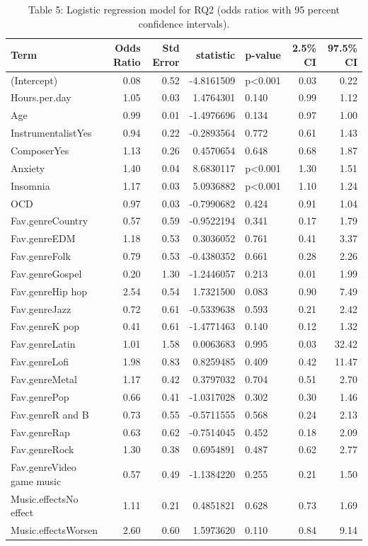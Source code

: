 \documentclass[
  letterpaper,
  DIV=11,
  numbers=noendperiod]{scrartcl}
\begin{document}
\begin{longtable}[t]{lrrrlrr}
\caption{Table 5: Logistic regression model for RQ2 (odds ratios with 95 percent confidence intervals).}\\
\toprule
Term & Odds Ratio & Std Error & statistic & p-value & 2.5\% CI & 97.5\% CI\\
\midrule
(Intercept) & 0.08 & 0.52 & -4.8161509 & p<0.001 & 0.03 & 0.22\\
Hours.per.day & 1.05 & 0.03 & 1.4764301 & 0.140 & 0.99 & 1.12\\
Age & 0.99 & 0.01 & -1.4976696 & 0.134 & 0.97 & 1.00\\
InstrumentalistYes & 0.94 & 0.22 & -0.2893564 & 0.772 & 0.61 & 1.43\\
ComposerYes & 1.13 & 0.26 & 0.4570654 & 0.648 & 0.68 & 1.87\\
\addlinespace
Anxiety & 1.40 & 0.04 & 8.6830117 & p<0.001 & 1.30 & 1.51\\
Insomnia & 1.17 & 0.03 & 5.0936882 & p<0.001 & 1.10 & 1.24\\
OCD & 0.97 & 0.03 & -0.7990682 & 0.424 & 0.91 & 1.04\\
Fav.genreCountry & 0.57 & 0.59 & -0.9522194 & 0.341 & 0.17 & 1.79\\
Fav.genreEDM & 1.18 & 0.53 & 0.3036052 & 0.761 & 0.41 & 3.37\\
\addlinespace
Fav.genreFolk & 0.79 & 0.53 & -0.4380352 & 0.661 & 0.28 & 2.26\\
Fav.genreGospel & 0.20 & 1.30 & -1.2446057 & 0.213 & 0.01 & 1.99\\
Fav.genreHip hop & 2.54 & 0.54 & 1.7321500 & 0.083 & 0.90 & 7.49\\
Fav.genreJazz & 0.72 & 0.61 & -0.5339638 & 0.593 & 0.21 & 2.42\\
Fav.genreK pop & 0.41 & 0.61 & -1.4771463 & 0.140 & 0.12 & 1.32\\
\addlinespace
Fav.genreLatin & 1.01 & 1.58 & 0.0063683 & 0.995 & 0.03 & 32.42\\
Fav.genreLofi & 1.98 & 0.83 & 0.8259485 & 0.409 & 0.42 & 11.47\\
Fav.genreMetal & 1.17 & 0.42 & 0.3797032 & 0.704 & 0.51 & 2.70\\
Fav.genrePop & 0.66 & 0.41 & -1.0317028 & 0.302 & 0.30 & 1.46\\
Fav.genreR and B & 0.73 & 0.55 & -0.5711555 & 0.568 & 0.24 & 2.13\\
\addlinespace
Fav.genreRap & 0.63 & 0.62 & -0.7514045 & 0.452 & 0.18 & 2.09\\
Fav.genreRock & 1.30 & 0.38 & 0.6954891 & 0.487 & 0.62 & 2.77\\
Fav.genreVideo game music & 0.57 & 0.49 & -1.1384220 & 0.255 & 0.21 & 1.50\\
Music.effectsNo effect & 1.11 & 0.21 & 0.4851821 & 0.628 & 0.73 & 1.69\\
Music.effectsWorsen & 2.60 & 0.60 & 1.5973620 & 0.110 & 0.84 & 9.14\\
\bottomrule
\end{longtable}
\end{document}
